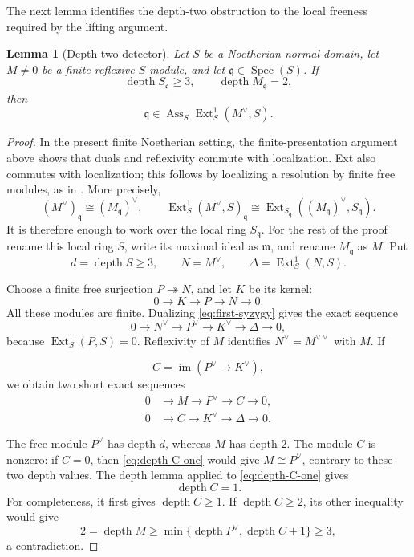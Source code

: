 \documentclass[reqno]{amsart}
\theoremstyle{plain}
\newtheorem{lemma}[theorem]{Lemma}
\theoremstyle{definition}
\newcommand{\Spec}{\operatorname{Spec}}
\newcommand{\Ass}{\operatorname{Ass}}
\newcommand{\depth}{\operatorname{depth}}
\newcommand{\Ext}{\operatorname{Ext}}
\begin{document}
The next lemma identifies the depth-two obstruction to the local freeness
required by the lifting argument.

\begin{lemma}[Depth-two detector]
\label{lem:depth-two-detector}
Let $S$ be a Noetherian normal domain, let $M\neq0$ be a finite reflexive
$S$-module, and let $\mathfrak q\in\Spec(S)$.  If
\[
 \depth S_{\mathfrak q}\geq3,
 \qquad
 \depth M_{\mathfrak q}=2,
\]
then
\[
 \mathfrak q\in
 \Ass_S\Ext^1_S(M^\vee,S).
\]
\end{lemma}

\begin{proof}
In the present finite Noetherian setting, the finite-presentation argument
above shows that duals and reflexivity commute with localization.  Ext also
commutes with localization; this follows by localizing a resolution by finite
free modules, as in \cite[Proposition~3.3.10]{Weibel}.  More precisely,
\[
 (M^\vee)_{\mathfrak q}\cong(M_{\mathfrak q})^\vee,
\qquad
 \Ext^1_S(M^\vee,S)_{\mathfrak q}
 \cong
 \Ext^1_{S_{\mathfrak q}}
 ((M_{\mathfrak q})^\vee,S_{\mathfrak q}).
\]
It is therefore enough to work over the local ring $S_{\mathfrak q}$.
For the rest of the proof rename this local ring $S$, write its maximal
ideal as $\mathfrak m$, and rename $M_{\mathfrak q}$ as $M$.  Put
\[
 d=\depth S\geq3,
 \qquad N=M^\vee,
 \qquad \Delta=\Ext^1_S(N,S).
\]

Choose a finite free surjection $P\twoheadrightarrow N$, and let $K$ be
its kernel:
\begin{equation}
\label{eq:first-syzygy}
 0\longrightarrow K\longrightarrow P\longrightarrow N\longrightarrow0.
\end{equation}
All these modules are finite.  Dualizing \eqref{eq:first-syzygy} gives the
exact sequence
\[
 0\longrightarrow N^\vee\longrightarrow P^\vee
 \longrightarrow K^\vee\longrightarrow\Delta\longrightarrow0,
\]
because $\Ext^1_S(P,S)=0$.  Reflexivity of $M$ identifies
$N^\vee=M^{\vee\vee}$ with $M$.  If

\[
 C=\operatorname{im}(P^\vee\to K^\vee),
\]
we obtain two short exact sequences
\begin{align}
 0&\longrightarrow M\longrightarrow P^\vee
      \longrightarrow C\longrightarrow0,
 \label{eq:depth-C-one}\\
 0&\longrightarrow C\longrightarrow K^\vee
      \longrightarrow\Delta\longrightarrow0.
 \label{eq:C-K-Delta}
\end{align}

The free module $P^\vee$ has depth $d$, whereas $M$ has depth $2$.
The module $C$ is nonzero: if $C=0$, then
\eqref{eq:depth-C-one} would give $M\cong P^\vee$, contrary to these two
depth values.
The depth lemma applied to \eqref{eq:depth-C-one} gives
\begin{equation}
\label{eq:C-depth-exact}
 \depth C=1.
\end{equation}
For completeness, it first gives $\depth C\geq1$.  If
$\depth C\geq2$, its other inequality would give
\[
 2=\depth M
 \geq\min\{\depth P^\vee,\depth C+1\}
 \geq3,
\]
a contradiction.


\end{proof}
\end{document}
